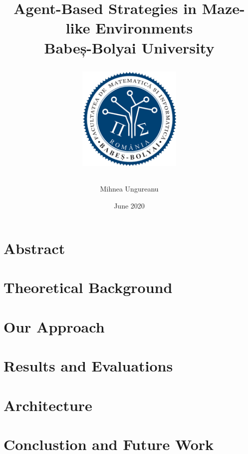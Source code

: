 \documentclass[12pt]{report}
\title{
    {Agent-Based Strategies in Maze-like Environments}\\
    {\large Babeș-Bolyai University}\\
    {
        \begin{figure}[h]
            \includegraphics[width=5cm]{logo_cs.png}
            \centering
        \end{figure}
    }
}
\author{Mihnea Ungureanu}
\date{June 2020}
\begin{document}
\maketitle

\chapter*{Abstract}

\tableofcontents

% 

 \chapter{Theoretical Background}
 

 \chapter{Our Approach}
 

 \chapter{Results and Evaluations}
 

 \chapter{Architecture}
 

 \chapter{Conclustion and Future Work}
 
\end{document}
